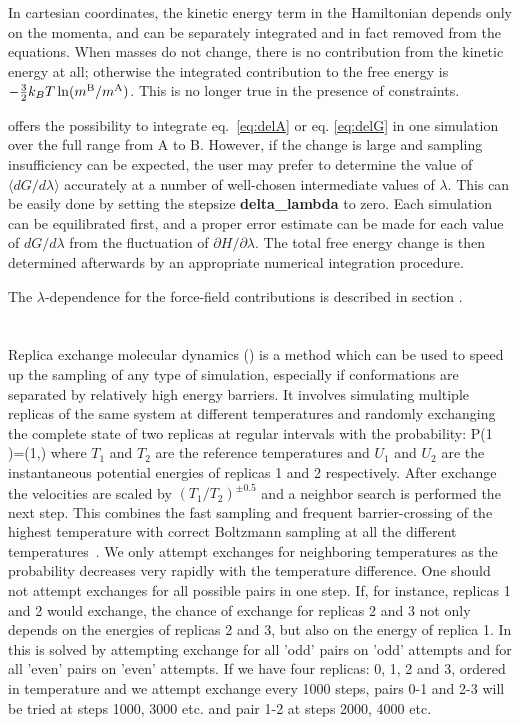 {In cartesian coordinates, the kinetic energy term in the Hamiltonian
depends only on the momenta, and can be separately integrated and in
fact removed from the equations. When masses do not change, there is
no contribution from the kinetic energy at all; otherwise the
integrated contribution to the free energy is $-\frac{3}{2} k_BT \ln
(m^{\mathrm{B}}/m^{\mathrm{A}})$. This is no longer true in the presence of constraints.
  
{\gromacs} offers the possibility to integrate eq.~\ref{eq:delA} or
eq. \ref{eq:delG} in one simulation over the full range from A to
B. However, if the change is large and sampling insufficiency can be
expected, the user may prefer to determine the value of $\langle
dG/d\lambda \rangle$ accurately at a number of well-chosen
intermediate values of $\lambda$. This can be easily done by setting
the stepsize \textbf{delta\_lambda} to zero. Each simulation can be
equilibrated first, and a proper error estimate can be made for each
value of $dG/d\lambda$ from the fluctuation of $\partial H/\partial
\lambda$. The total free energy change is then determined afterwards
by an appropriate numerical integration procedure.

The $\lambda$-dependence for the force-field contributions is
described in section .

\section{}
Replica exchange molecular dynamics ()
is a method which can be used to speed up
the sampling of any type of simulation, especially if
conformations are separated by relatively high energy barriers.
It involves simulating multiple replicas of the same system
at different temperatures and randomly exchanging the complete state
of two replicas at regular intervals with the probability:
\beq
P(1 )=\min\left(1,\exp{} \right)
\eeq
where $T_1$ and $T_2$ are the reference temperatures and $U_1$ and $U_2$
are the instantaneous potential energies of replicas 1 and 2 respectively.
After exchange the velocities are scaled by $(T_1/T_2)^{\pm0.5}$
and a neighbor search is performed the next step.
This combines the fast sampling and frequent barrier-crossing
of the highest temperature with correct Boltzmann sampling at
all the different temperatures~\cite{Hukushima96a,Sugita99}.
We only attempt exchanges for neighboring temperatures as the probability
decreases very rapidly with the temperature difference.
One should not attempt exchanges for all possible pairs in one step.
If, for instance, replicas 1 and 2 would exchange, the chance of
exchange for replicas 2 and 3 not only depends on the energies of
replicas 2 and 3, but also on the energy of replica 1.
In {\gromacs} this is solved by attempting exchange for all 'odd'
pairs on 'odd' attempts and for all 'even' pairs on 'even' attempts.
If we have four replicas: 0, 1, 2 and 3, ordered in temperature
and we attempt exchange every 1000 steps, pairs 0-1 and 2-3
will be tried at steps 1000, 3000 etc. and pair 1-2 at steps 2000, 4000 etc.

}
